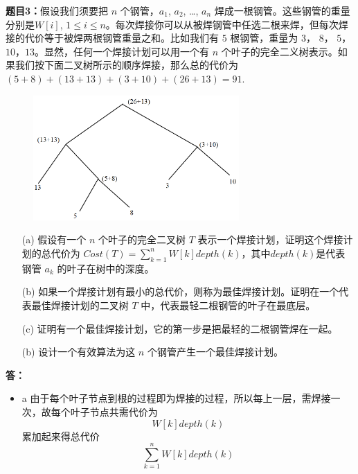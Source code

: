 \documentclass[12pt,a4paper]{article}
\begin{document}
\begin{CJK*}{UTF8}{gbsn}
\begin{itemize}
		\end{itemize}

		\vspace{10pt}
		\noindent
		{\bf 题目3：}假设我们须要把 $n$ 个钢管，$a_1$, $a_2$, …, $a_n$ 焊成一根钢管。这些钢管的重量分别是$W[i]$, $1 \leq i \leq n$。每次焊接你可以从被焊钢管中任选二根来焊，但每次焊接的代价等于被焊两根钢管重量之和。比如我们有 $5$ 根钢管，重量为 $3$， $8$， $5$， $10$，$13$。显然，任何一个焊接计划可以用一个有 $n$ 个叶子的完全二义树表示。如果我们按下面二叉树所示的顺序焊接，那么总的代价为 $(5+8) + (13+13) + (3+10) + (26+13) = 91$. \\
		\begin{figure}[h]
			\centering %
			\includegraphics[width=0.7\textwidth]{1} %
		\end{figure}

		\begin{enumerate}
			\item[(a)]  假设有一个 $n$ 个叶子的完全二叉树 $T$ 表示一个焊接计划，证明这个焊接计划的总代价为 $Cost(T)=\sum_{k=1}^{n} W[k]depth(k)$，其中$depth(k)$是代表钢管 $a_k$ 的叶子在树中的深度。
			\item[(b)]  如果一个焊接计划有最小的总代价，则称为最佳焊接计划。证明在一个代表最佳焊接计划的二叉树 $T$ 中，代表最轻二根钢管的叶子在最底层。
			\item[(c)]  证明有一个最佳焊接计划，它的第一步是把最轻的二根钢管焊在一起。
			\item[(b)]  设计一个有效算法为这 $n$ 个钢管产生一个最佳焊接计划。
		\end{enumerate}

		\vspace{5pt}
		\noindent
		{\bf 答：}

		\begin{itemize}
			\item{a}
				由于每个叶子节点到根的过程即为焊接的过程，所以每上一层，需焊接一次，故每个叶子节点共需代价为$$W[k]depth(k)$$累加起来得总代价
				$$\sum_{k=1}^{n} W[k]depth(k)$$


\end{itemize}
\end{CJK*}
\end{document}
